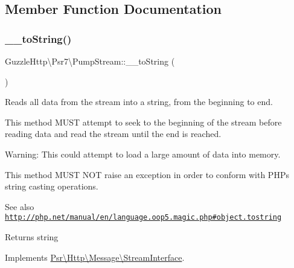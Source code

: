 \subsection{Member Function Documentation}
\mbox{\label{classGuzzleHttp_1_1Psr7_1_1PumpStream_a2dbe76356aa5c4552a31ca4c705c579e}} 
\subsubsection{\texorpdfstring{\+\_\+\+\_\+to\+String()}{\_\_toString()}}
{\footnotesize\ttfamily Guzzle\+Http\textbackslash{}\+Psr7\textbackslash{}\+Pump\+Stream\+::\+\_\+\+\_\+to\+String (\begin{DoxyParamCaption}{ }\end{DoxyParamCaption})}

Reads all data from the stream into a string, from the beginning to end.

This method M\+U\+ST attempt to seek to the beginning of the stream before reading data and read the stream until the end is reached.

Warning\+: This could attempt to load a large amount of data into memory.

This method M\+U\+ST N\+OT raise an exception in order to conform with P\+HP\textquotesingle{}s string casting operations.

\begin{DoxySeeAlso}{See also}
\href{http://php.net/manual/en/language.oop5.magic.php#object.tostring}{\tt http\+://php.\+net/manual/en/language.\+oop5.\+magic.\+php\#object.\+tostring} 
\end{DoxySeeAlso}
\begin{DoxyReturn}{Returns}
string 
\end{DoxyReturn}


Implements \hyperlink{interfacePsr_1_1Http_1_1Message_1_1StreamInterface_a72df4e8851ae1a81087f3415fd6d73cd}{Psr\textbackslash{}\+Http\textbackslash{}\+Message\textbackslash{}\+Stream\+Interface}.

\mbox{\label{classGuzzleHttp_1_1Psr7_1_1PumpStream_a08eeaef85573c150498566ffa9e1f872}} 
